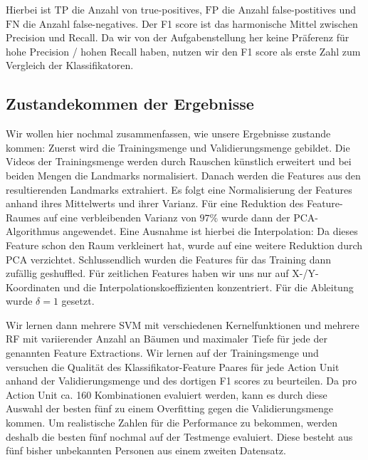 Hierbei ist $\text{TP}$ die Anzahl von true-positives, $\text{FP}$ die Anzahl false-postitives und $\text{FN}$ die Anzahl false-negatives. Der F1 score ist das harmonische Mittel zwischen Precision und Recall. Da wir
von der Aufgabenstellung her keine Präferenz für hohe Precision / hohen Recall
haben, nutzen wir den F1 score als erste Zahl zum Vergleich der Klassifikatoren.

\subsection{Zustandekommen der Ergebnisse}
Wir wollen hier nochmal zusammenfassen, wie unsere Ergebnisse zustande kommen:
Zuerst wird die Trainingsmenge und Validierungsmenge gebildet.
Die Videos der Trainingsmenge werden durch Rauschen künstlich erweitert und bei beiden Mengen die Landmarks normalisiert.
Danach werden die Features aus den resultierenden Landmarks extrahiert.
Es folgt eine Normalisierung der Features anhand ihres Mittelwerts und ihrer Varianz. 
Für eine Reduktion des Feature-Raumes auf eine verbleibenden Varianz von $97\%$ wurde dann der PCA-Algorithmus angewendet.
Eine Ausnahme ist hierbei die Interpolation: Da dieses Feature schon den Raum verkleinert hat, wurde auf eine weitere Reduktion durch PCA verzichtet.
Schlussendlich wurden die Features für das Training dann zufällig geshuffled. Für zeitlichen Features haben wir uns nur auf X-/Y-Koordinaten und die Interpolationskoeffizienten konzentriert. Für die Ableitung wurde $\delta=1$ gesetzt.

Wir lernen dann mehrere SVM mit verschiedenen Kernelfunktionen und mehrere RF
mit variierender Anzahl an Bäumen und maximaler Tiefe für jede der genannten
Feature Extractions. Wir lernen auf der Trainingsmenge und versuchen die Qualität
des Klassifikator-Feature Paares für jede Action Unit anhand der
Validierungsmenge und des dortigen F1 scores zu beurteilen. Da pro Action Unit
ca. 160 Kombinationen evaluiert werden, kann es durch diese Auswahl der besten
fünf zu einem Overfitting gegen die Validierungsmenge kommen. Um realistische
Zahlen für die Performance zu bekommen, werden deshalb die besten fünf nochmal
auf der Testmenge evaluiert. Diese besteht aus fünf bisher unbekannten
Personen aus einem zweiten Datensatz.


